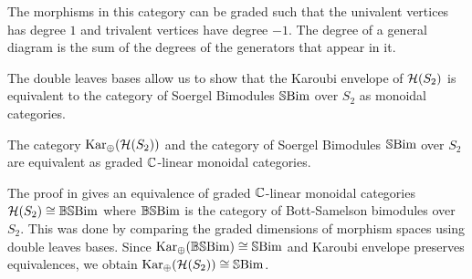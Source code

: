 The morphisms in this category can be graded such that the univalent vertices has degree $1$ and trivalent vertices have degree $-1$. The degree of a general diagram is the sum of the degrees of the generators that appear in it.


The double leaves bases allow us to show that the Karoubi envelope of $\mathcal{H}(S_2)$ is equivalent to the category of Soergel Bimodules $\operatorname{\mathbb{S}Bim}$ over $S_2$ as monoidal categories.

\begin{theorem} \label{thm:one-col-sbim-equiv}
    The category $\operatorname{Kar_\oplus}(\mathcal{H}(S_2))$ and the category of Soergel Bimodules $\operatorname{\mathbb{S}Bim}$ over $S_2$ are equivalent as graded $\mathbb{C}$-linear monoidal categories.
\end{theorem}
The proof in \cite{elias-williamson-soergel-calculus} gives an equivalence of graded $\mathbb{C}$-linear monoidal categories $\mathcal{H}(S_2) \cong \operatorname{\mathbb{BS}Bim}$ where $\operatorname{\mathbb{BS}Bim}$ is the category of Bott-Samelson bimodules over $S_2$. This was done by comparing the graded dimensions of morphism spaces using double leaves bases. Since $\operatorname{Kar_\oplus}(\operatorname{\mathbb{BS}Bim}) \cong \operatorname{\mathbb{S}Bim}$ and Karoubi envelope preserves equivalences, we obtain $\operatorname{Kar_\oplus}(\mathcal{H}(S_2)) \cong \operatorname{\mathbb{S}Bim}$.

